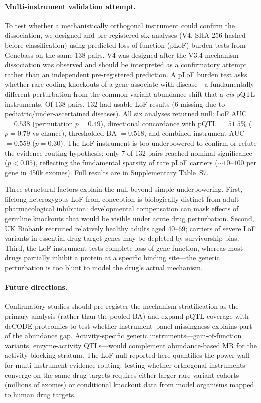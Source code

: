 \documentclass[11pt]{article}
\begin{document}
\paragraph{Multi-instrument validation attempt.}
To test whether a mechanistically orthogonal instrument could confirm the dissociation, we designed and pre-registered six analyses (V4, SHA-256 hashed before classification) using predicted loss-of-function (pLoF) burden tests from Genebass \cite{karczewski2022genebass} on the same 138 pairs. V4 was designed after the V3.4 mechanism dissociation was observed and should be interpreted as a confirmatory attempt rather than an independent pre-registered prediction. A pLoF burden test asks whether rare coding knockouts of a gene associate with disease---a fundamentally different perturbation from the common-variant abundance shift that a \emph{cis}-pQTL instruments. Of 138 pairs, 132 had usable LoF results (6 missing due to pediatric/under-ascertained diseases). All six analyses returned null: LoF AUC $= 0.538$ (permutation $p = 0.49$), directional concordance with pQTL $= 51.5\%$ ($p = 0.79$ vs chance), thresholded BA $= 0.518$, and combined-instrument AUC $= 0.559$ ($p = 0.30$). The LoF instrument is too underpowered to confirm or refute the evidence-routing hypothesis: only 7 of 132 pairs reached nominal significance ($p < 0.05$), reflecting the fundamental sparsity of rare pLoF carriers (${\sim}10$--$100$ per gene in 450k exomes). Full results are in Supplementary Table~S7.

Three structural factors explain the null beyond simple underpowering. First, lifelong heterozygous LoF from conception is biologically distinct from adult pharmacological inhibition: developmental compensation can mask effects of germline knockouts that would be visible under acute drug perturbation. Second, UK Biobank recruited relatively healthy adults aged 40--69; carriers of severe LoF variants in essential drug-target genes may be depleted by survivorship bias. Third, the LoF instrument tests complete loss of gene function, whereas most drugs partially inhibit a protein at a specific binding site---the genetic perturbation is too blunt to model the drug's actual mechanism.

\paragraph{Future directions.}
Confirmatory studies should pre-register the mechanism stratification as the primary analysis (rather than the pooled BA) and expand pQTL coverage with deCODE proteomics to test whether instrument--panel missingness explains part of the abundance gap. Activity-specific genetic instruments---gain-of-function variants, enzyme-activity QTLs---would complement abundance-based MR for the activity-blocking stratum. The LoF null reported here quantifies the power wall for multi-instrument evidence routing: testing whether orthogonal instruments converge on the same drug targets requires either larger rare-variant cohorts (millions of exomes) or conditional knockout data from model organisms mapped to human drug targets.
\end{document}
